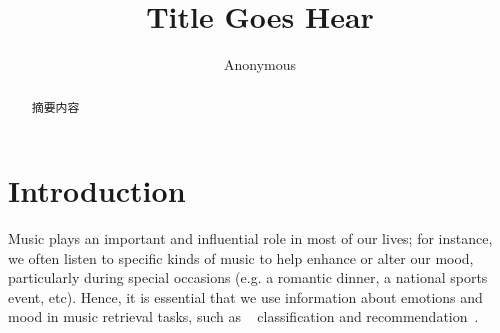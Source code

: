 \documentclass{llncs}
\begin{document}
	
\title{Title Goes Hear}
\author{Anonymous}
\maketitle

\begin{abstract}
摘要内容
\end{abstract}


\section{Introduction}


Music plays an important and influential role in most of our lives; for instance, we often listen to specific kinds of music to help enhance or alter our mood, particularly during special occasions (e.g. a romantic dinner, a national sports event, etc). Hence, it is essential that we use information about emotions and mood in music retrieval tasks, such as ~\cite{DBLP:journals/corr/abs-1206-5538} classification and recommendation~\cite{li}. 
\end{document}
